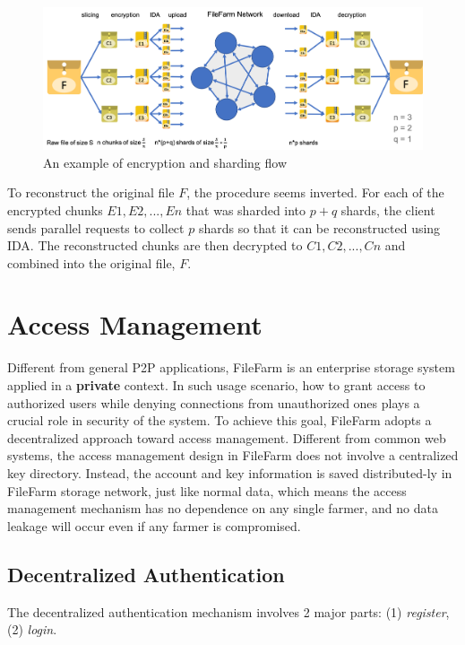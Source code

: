\begin{figure}[!b]
  \centering
    \includegraphics[width=15cm]{figures/data_confidentiality.png}
    \caption{An example of encryption and sharding flow}
    \label{fig:dataconfidentiality}
\end{figure}

To reconstruct the original file $F$, the procedure seems inverted. For each of the encrypted chunks $E1, E2, ..., En$ that was sharded into $p+q$ shards, the client sends parallel requests to collect $p$ shards so that it can be reconstructed using IDA. The reconstructed chunks are then decrypted to $C1, C2, ..., Cn$ and combined into the original file, $F$.

\section{Access Management}
\label{s:accessmanagement}

Different from general P2P applications, FileFarm is an enterprise storage system applied in a \textbf{private} context. In such usage scenario, how to grant access to authorized users while denying connections from unauthorized ones plays a crucial role in security of the system. To achieve this goal, FileFarm adopts a decentralized approach toward access management. Different from common web systems, the access management design in FileFarm does not involve a centralized key directory. Instead, the account and key information is saved distributed-ly in FileFarm storage network, just like normal data, which means the access management mechanism has no dependence on any single farmer, and no data leakage will occur even if any farmer is compromised.

\subsection{Decentralized Authentication}
\label{ss:decentralizedauthentication}

The decentralized authentication mechanism involves 2 major parts: (1) \textit{register}, (2) \textit{login}.

